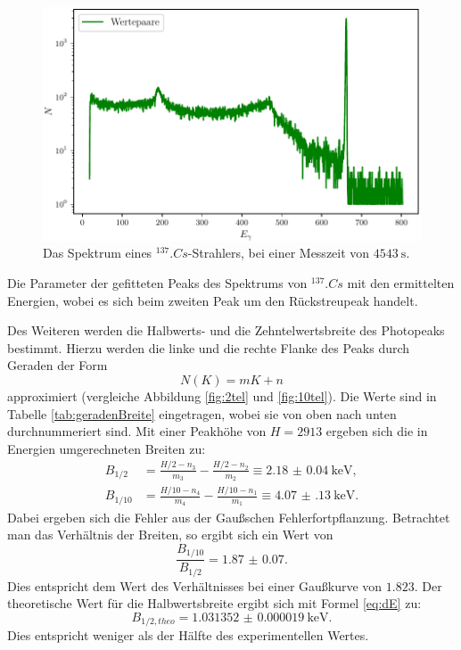 \begin{figure}
	\centering
	\includegraphics[width=\linewidth-60pt,height=\textheight-60pt,keepaspectratio]{content/images/Cs137.pdf}
	\caption{Das Spektrum eines $^{137}.{Cs}$-Strahlers, bei einer Messzeit von $\SI{4543}{\second}$.}
	\label{fig:SpektrumCs}
\end{figure}

\begin{table}
	\centering
	\caption{Die Parameter der gefitteten Peaks des Spektrums von $^{137}.{Cs}$ mit den ermittelten Energien, wobei es sich beim zweiten Peak um den Rückstreupeak handelt.}
	
	\label{tab:parameterCs}
\end{table}

\noindent Des Weiteren werden die Halbwerts- und die Zehntelwertsbreite des Photopeaks bestimmt. Hierzu werden die linke und die rechte Flanke des Peaks durch Geraden der Form 
\begin{equation}
N(K) = mK+n	\label{eq:Gerade}
\end{equation}
approximiert (vergleiche Abbildung \ref{fig:2tel} und \ref{fig:10tel}). Die Werte sind in Tabelle \ref{tab:geradenBreite} eingetragen, wobei sie von oben nach unten durchnummeriert sind. Mit einer Peakhöhe von $H=2913$ ergeben sich die in Energien umgerechneten Breiten zu:
\begin{align*}
B_{1/2} &= \frac{H/2-n_3}{m_3}-\frac{H/2-n_2}{m_2} \equiv \SI{2.18(4)}{\kilo\electronvolt}\text{,}\\
B_{1/10} &= \frac{H/10-n_4}{m_4}-\frac{H/10-n_1}{m_1} \equiv \SI{4.07(13)}{\kilo\electronvolt}\text{.}
\end{align*}
Dabei ergeben sich die Fehler aus der Gaußschen Fehlerfortpflanzung.
Betrachtet man das Verhältnis der Breiten, so ergibt sich ein Wert von 
\[
\frac{B_{1/10}}{B_{1/2}} = \num{1.87(7)}\text{.}
\]
Dies entspricht dem Wert des Verhältnisses bei einer Gaußkurve von $\num{1.823}$.
Der theoretische Wert für die Halbwertsbreite ergibt sich mit Formel \eqref{eq:dE} zu:
\[
B_{1/2,theo} = \SI{1.031352(19)}{\kilo\electronvolt}\text{.}
\]
Dies entspricht weniger als der Hälfte des experimentellen Wertes.

